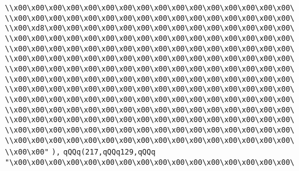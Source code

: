 \verb|\\x00\x00\x00\x00\x00\x00\x00\x00\x00\x00\x00\x00\x00\x00\x00\x00\|\newline
\verb|\\x00\x00\x00\x00\x00\x00\x00\x00\x00\x00\x00\x00\x00\x00\x00\x00\|\newline
\verb|\\x00\xd8\x00\x00\x00\x00\x00\x00\x00\x00\x00\x00\x00\x00\x00\x00\|\newline
\verb|\\x00\x00\x00\x00\x00\x00\x00\x00\x00\x00\x00\x00\x00\x00\x00\x00\|\newline
\verb|\\x00\x00\x00\x00\x00\x00\x00\x00\x00\x00\x00\x00\x00\x00\x00\x00\|\newline
\verb|\\x00\x00\x00\x00\x00\x00\x00\x00\x00\x00\x00\x00\x00\x00\x00\x00\|\newline
\verb|\\x00\x00\x00\x00\x00\x00\x00\x00\x00\x00\x00\x00\x00\x00\x00\x00\|\newline
\verb|\\x00\x00\x00\x00\x00\x00\x00\x00\x00\x00\x00\x00\x00\x00\x00\x00\|\newline
\verb|\\x00\x00\x00\x00\x00\x00\x00\x00\x00\x00\x00\x00\x00\x00\x00\x00\|\newline
\verb|\\x00\x00\x00\x00\x00\x00\x00\x00\x00\x00\x00\x00\x00\x00\x00\x00\|\newline
\verb|\\x00\x00\x00\x00\x00\x00\x00\x00\x00\x00\x00\x00\x00\x00\x00\x00\|\newline
\verb|\\x00\x00\x00\x00\x00\x00\x00\x00\x00\x00\x00\x00\x00\x00\x00\x00\|\newline
\verb|\\x00\x00\x00\x00\x00\x00\x00\x00\x00\x00\x00\x00\x00\x00\x00\x00\|\newline
\verb|\\x00\x00\x00\x00\x00\x00\x00\x00\x00\x00\x00\x00\x00\x00\x00\x00\|\newline
\verb|\\x00\x00"|\newline
\verb|),|\newline
\verb|qQQq(217,qQQq129,qQQq|\newline
\verb|"\x00\x00\x00\x00\x00\x00\x00\x00\x00\x00\x00\x00\x00\x00\x00\x00\|\newline
